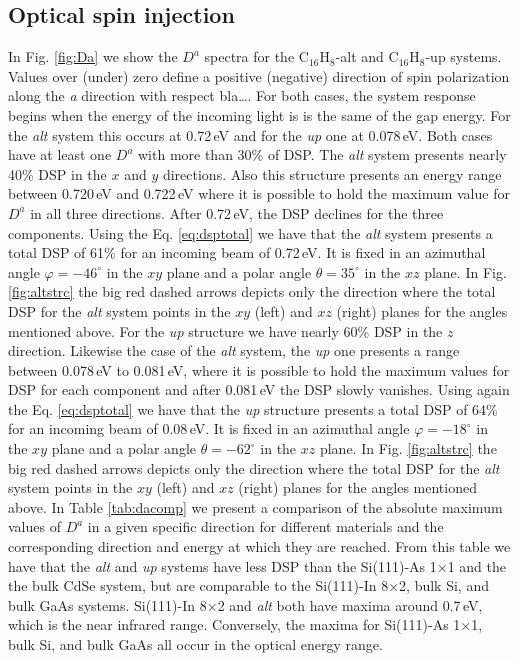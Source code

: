 \documentclass[pss]{wiley2sp} %
\begin{document}
\subsection{Optical spin injection}\label{subsec:results-DSP}

In Fig. \ref{fig:Da} we show the $D^{a}$ spectra for the C$_{16}$H$_{8}$-alt and C$_{16}$H$_{8}$-up systems. Values over (under) zero define a positive (negative) direction of spin polarization along the \emph{a} direction with respect {\Large bla\ldots}. For both cases, the system response begins when the energy of the incoming light is is the same of the gap energy. For the \emph{alt} system this occurs at 0.72\,eV and for the \emph{up} one at 0.078\,eV. Both cases have at least one {$D^{a}$} with more than 30\% of DSP. The \emph{alt} system presents nearly 40\% DSP in the $x$ and $y$ directions. Also this structure presents an energy range between 0.720\,eV and 0.722\,eV where it is possible to hold the maximum value for $D^{a}$ in all three directions. After 0.72\,eV, the DSP declines for the three components. Using the Eq. \eqref{eq:dsptotal} we have that the \emph{alt} system presents a total DSP of 61\% for an incoming beam of 0.72\,eV. It is fixed in an azimuthal angle $\varphi=-46^{\circ}$ in the $xy$ plane and a polar angle $\theta=35^{\circ}$ in the $xz$ plane. In Fig. \ref{fig:altstrc} the big red dashed arrows depicts only the direction where the total DSP for the \emph{alt} system points in the $xy$ (left) and $xz$ (right) planes for the angles mentioned above. For the \emph{up} structure we have nearly 60\% DSP in the $z$ direction. Likewise the case of the \emph{alt} system, the \emph{up} one presents a range between 0.078\,eV to 0.081\,eV, where it is possible to hold the maximum values for DSP for each component and after 0.081\,eV the DSP slowly vanishes. Using again the Eq. \eqref{eq:dsptotal} we have that the \emph{up} structure presents a total DSP of 64\% for an incoming beam of 0.08\,eV. It is fixed in an azimuthal angle $\varphi=-18^{\circ}$ in the $xy$ plane and a polar angle $\theta=-62^{\circ}$ in the $xz$ plane. In Fig. \ref{fig:altstrc} the big red dashed arrows depicts only the direction where the total DSP for the \emph{alt} system points in the $xy$ (left) and $xz$ (right) planes for the angles mentioned above. In Table \ref{tab:dacomp} we present a comparison of the absolute maximum values of $D^{a}$ in a given specific direction for different materials and the corresponding direction and energy at which they are reached. From this table we have that the \emph{alt} and \emph{up} systems have less DSP than the Si(111)-As 1$\times$1 and the the bulk CdSe system, but are comparable to the Si(111)-In 8$\times$2, bulk Si, and bulk GaAs systems. Si(111)-In 8$\times$2 and \emph{alt} both have maxima around 0.7\,eV, which is the near infrared range. Conversely, the maxima for Si(111)-As 1$\times$1, bulk Si, and bulk GaAs all occur in the optical energy range.
\end{document}

